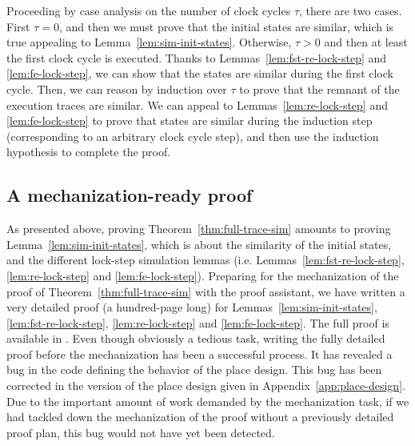 \begin{pf}
  
  Proceeding by case analysis on the number of clock cycles $\tau$,
  there are two cases. First $\tau=0$, and then we must prove that the
  initial states are similar, which is true appealing to
  Lemma~\ref{lem:sim-init-states}. Otherwise, $\tau>0$ and then at
  least the first clock cycle is executed. Thanks to
  Lemmas~\ref{lem:fst-re-lock-step} and \ref{lem:fe-lock-step}, we can
  show that the states are similar during the first clock cycle. Then,
  we can reason by induction over $\tau$ to prove that the remnant of
  the execution traces are similar. We can appeal to
  Lemmas~\ref{lem:re-lock-step} and \ref{lem:fe-lock-step} to prove
  that states are similar during the induction step (corresponding to
  an arbitrary clock cycle step), and then use the induction
  hypothesis to complete the proof.

\end{pf}

\subsection{A mechanization-ready proof}
\label{sec:mecha-ready-pf}

As presented above, proving Theorem~\ref{thm:full-trace-sim} amounts
to proving Lemma~\ref{lem:sim-init-states}, which is about the
similarity of the initial states, and the different lock-step
simulation lemmas (i.e. Lemmas~\ref{lem:fst-re-lock-step},
\ref{lem:re-lock-step} and \ref{lem:fe-lock-step}). Preparing for the
mechanization of the proof of Theorem~\ref{thm:full-trace-sim} with
the \coq{} proof assistant, we have written a very detailed proof (a
hundred-page long) for Lemmas~\ref{lem:sim-init-states},
\ref{lem:fst-re-lock-step}, \ref{lem:re-lock-step} and
\ref{lem:fe-lock-step}. The full proof is available in
\cite{Iampietro2021}. Even though obviously a tedious task, writing
the fully detailed proof before the mechanization has been a
successful process. It has revealed a bug in the \vhdl{} code defining
the behavior of the place design. This bug has been corrected in the
version of the place design given in Appendix~\ref{app:place-design}.
Due to the important amount of work demanded by the mechanization
task, if we had tackled down the mechanization of the proof without a
previously
detailed proof plan, this bug would not have yet been detected. \\

